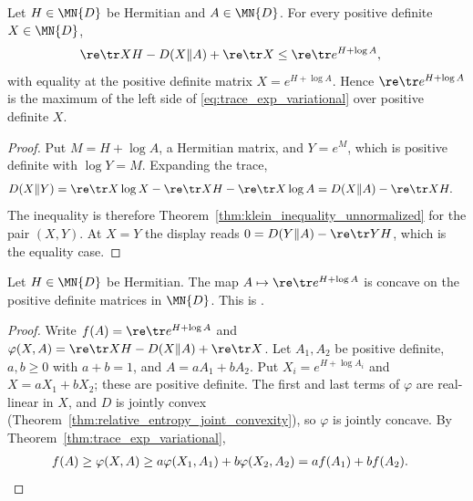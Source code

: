 \begin{theorem}
    \label{thm:trace_exp_variational}
    \leanok
    Let $H\in\MN{D}$ be Hermitian and $A\in\MN{D}$. For every positive definite
    $X\in\MN{D}$,
    \begin{align}
        \re\tr XH-D(X\Vert A)+\re\tr X
         & \le\re\tr e^{H+\log A},
        \label{eq:trace_exp_variational}
    \end{align}
    with equality at the positive definite matrix $X=e^{H+\log A}$. Hence
    $\re\tr e^{H+\log A}$ is the maximum of the left side of
    \eqref{eq:trace_exp_variational} over positive definite $X$.
\end{theorem}

\begin{proof}\leanok
    Put $M=H+\log A$, a Hermitian matrix, and $Y=e^M$, which is positive
    definite with $\log Y=M$. Expanding the trace,
    \begin{align}
        D(X\Vert Y)
         & =\re\tr X\log X-\re\tr XH-\re\tr X\log A
        =D(X\Vert A)-\re\tr XH.
        \notag
    \end{align}
    The inequality is therefore Theorem~\ref{thm:klein_inequality_unnormalized}
    for the pair $(X,Y)$. At $X=Y$ the display reads
    $0=D(Y\Vert A)-\re\tr YH$, which is the equality case.
\end{proof}

\begin{theorem}
    \label{thm:lieb_trace_exp_concavity}
    \leanok
    Let $H\in\MN{D}$ be Hermitian. The map $A\mapsto\re\tr e^{H+\log A}$ is
    concave on the positive definite matrices in $\MN{D}$.
    This is \cite[Theorem~6]{Lieb1973Convex}.
\end{theorem}

\begin{proof}\leanok
    Write $f(A)=\re\tr e^{H+\log A}$ and
    $\varphi(X,A)=\re\tr XH-D(X\Vert A)+\re\tr X$. Let $A_1,A_2$ be positive
    definite, $a,b\ge0$ with $a+b=1$, and $A=aA_1+bA_2$. Put
    $X_i=e^{H+\log A_i}$ and $X=aX_1+bX_2$; these are positive definite. The
    first and last terms of $\varphi$ are real-linear in $X$, and $D$ is jointly
    convex (Theorem~\ref{thm:relative_entropy_joint_convexity}), so $\varphi$ is
    jointly concave. By Theorem~\ref{thm:trace_exp_variational},
    \begin{align}
        f(A)
         & \ge\varphi(X,A)
        \ge a\varphi(X_1,A_1)+b\varphi(X_2,A_2)
        =af(A_1)+bf(A_2).
        \notag
    \end{align}
\end{proof}
